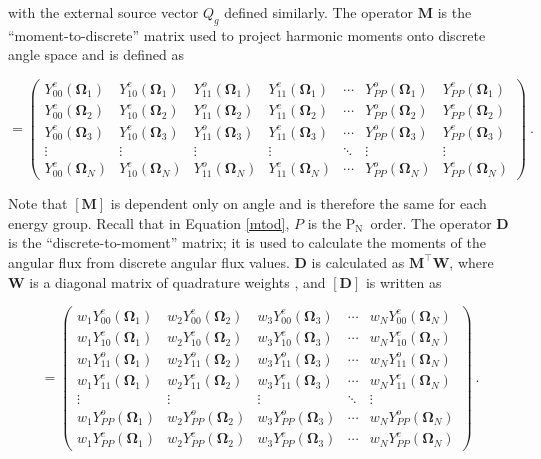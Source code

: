 \documentclass{article} %
\newcommand{\bo}{\mathbf\Omega}
\newcommand{\pn}{P$_\mathrm{N}$}
\newcommand{\ve}[1]{\ensuremath{\mathbf{#1}}}
\newcommand{\Ye}[2]{\ensuremath{Y^e_{#1}(\bo_#2)}}
\newcommand{\Yo}[2]{\ensuremath{Y^o_{#1}(\bo_#2)}}
\begin{document}
\noindent with the external source vector $Q_g$ defined similarly. The operator
$\ve{M}$ is the ``moment-to-discrete'' matrix
used to project harmonic moments onto discrete angle space and is defined as

\begin{equation}
[\ve{M}] = \begin{pmatrix}
\Ye{00}{1} & \Ye{10}{1} & \Yo{11}{1} & \Ye{11}{1} & \cdots & \Yo{PP}{1} & \Ye{PP}{1} \\
\Ye{00}{2} & \Ye{10}{2} & \Yo{11}{2} & \Ye{11}{2} & \cdots & \Yo{PP}{2} & \Ye{PP}{2} \\
\Ye{00}{3} & \Ye{10}{3} & \Yo{11}{3} & \Ye{11}{3} & \cdots & \Yo{PP}{3} & \Ye{PP}{3} \\
\vdots     & \vdots     & \vdots     & \vdots     & \ddots & \vdots     & \vdots     \\
\Ye{00}{N} & \Ye{10}{N} & \Yo{11}{N} & \Ye{11}{N} & \cdots & \Yo{PP}{N} & \Ye{PP}{N}
  \end{pmatrix}\:.
\label{mtod}
\end{equation}

\noindent Note that $[\ve{M}]$ is dependent only on angle and is therefore the
same for each energy group. Recall that in Equation \ref{mtod}, $P$ is the \pn\
order. The operator $\ve{D}$ is the ``discrete-to-moment''
matrix; it is used to calculate the moments of the angular flux from discrete
angular flux values. $\ve{D}$ is calculated as $\ve{M}^\top\ve{W}$, where
$\ve{W}$ is a diagonal matrix of quadrature weights \cite{exmm}, and $[\ve{D}]$ is
written as

\begin{equation}
  [\ve{D}] = \begin{pmatrix}
    w_1\Ye{00}{1} & w_2\Ye{00}{2} & w_3\Ye{00}{3} & \cdots & w_N\Ye{00}{N} \\ 
    w_1\Ye{10}{1} & w_2\Ye{10}{2} & w_3\Ye{10}{3} & \cdots & w_N\Ye{10}{N} \\
    w_1\Yo{11}{1} & w_2\Yo{11}{2} & w_3\Yo{11}{3} & \cdots & w_N\Yo{11}{N} \\
    w_1\Ye{11}{1} & w_2\Ye{11}{2} & w_3\Ye{11}{3} & \cdots & w_N\Ye{11}{N} \\
    \vdots        & \vdots        & \vdots        & \ddots & \vdots        \\
    w_1\Yo{PP}{1} & w_2\Yo{PP}{2} & w_3\Yo{PP}{3} & \cdots & w_N\Yo{PP}{N} \\
    w_1\Ye{PP}{1} & w_2\Ye{PP}{2} & w_3\Ye{PP}{3} & \cdots & w_N\Ye{PP}{N}
  \end{pmatrix}\:.
\end{equation}
\end{document}
